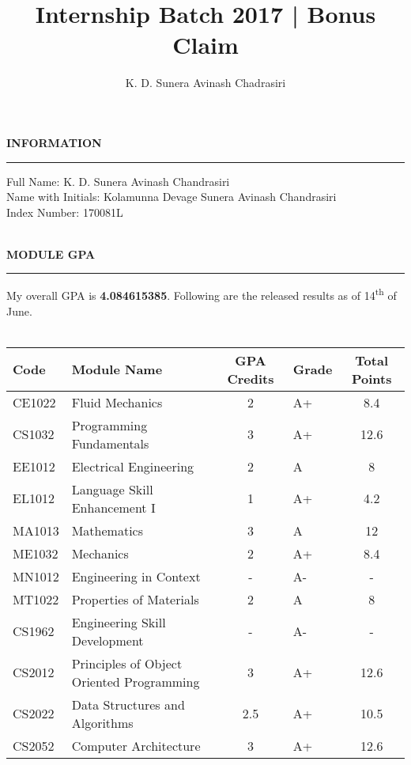 \documentclass{article}
\title{Internship Batch 2017 | Bonus Claim}
\author{K. D. Sunera Avinash Chadrasiri}
\newenvironment{rSection}[1]{
    \sectionskip
    \MakeUppercase{\bf #1} 
    \sectionlineskip
    \hrule
    \begin{list}{}{ 
        \setlength{\leftmargin}{1.5em} 
    }
    \item[]
}{
    \end{list}
}
\def\sectionskip{\medskip}
\def\sectionlineskip{\medskip}
\begin{document}
\begin{rSection}{Information}
Full Name:              \hfill K. D. Sunera Avinash Chandrasiri\\
Name with Initials:     \hfill Kolamunna Devage Sunera Avinash Chandrasiri\\
Index Number:           \hfill 170081L\\ \\
\end{rSection}

\begin{rSection}{Module GPA}
My overall GPA is \textbf{4.084615385}. Following are the released results as of 14\textsuperscript{th} of June.\\ \\
\begin{tabularx}{\linewidth}{|l|X|c|l|c|}
    \hline
    \bf Code&   \bf Module Name                             & \bf GPA Credits & \bf Grade & \bf Total Points \\
    \hline
    \hline
    CE1022  &   Fluid Mechanics	                            & 2     &    A+ &    8.4    \\
    CS1032  &   Programming Fundamentals	                & 3     &    A+ &   12.6    \\
    EE1012  &   Electrical Engineering	                    & 2     &    A  &      8    \\
    EL1012  &   Language Skill Enhancement I	            & 1     &    A+ &    4.2    \\
    MA1013  &   Mathematics	                                & 3     &    A  &     12    \\
    ME1032  &   Mechanics	                                & 2     &    A+ &    8.4    \\
    MN1012  &   Engineering in Context	                    & -     &    A- &      -    \\
    MT1022  &   Properties of Materials	                    & 2     &    A  &      8    \\
    \hline
    CS1962  &   Engineering Skill Development	            & -     &    A- &      -    \\
    CS2012  &   Principles of Object Oriented Programming   & 3     &    A+ &   12.6    \\
    CS2022  &   Data Structures and Algorithms	            & 2.5   &    A+ &   10.5    \\
    CS2052  &   Computer Architecture	                    & 3     &    A+ &   12.6    \\

\end{tabularx}
\end{rSection}
\end{document}

